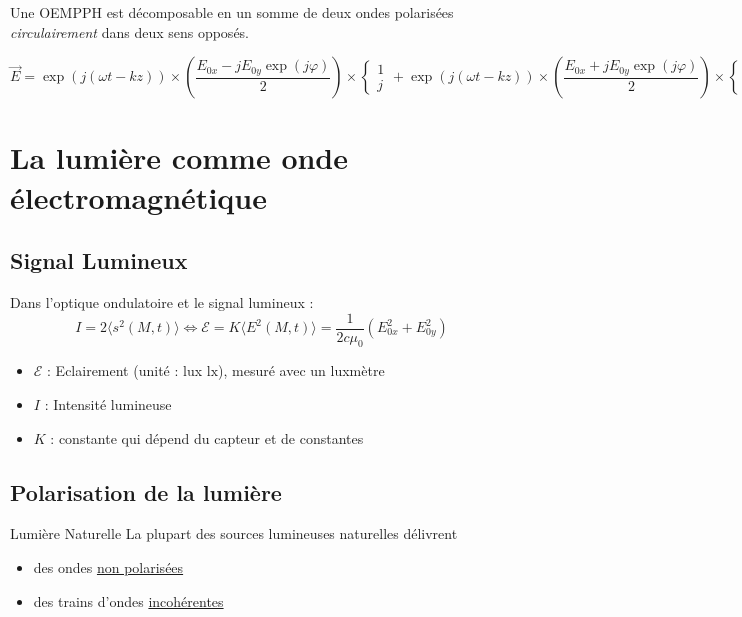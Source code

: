 Une OEMPPH est décomposable en un somme de deux ondes polarisées \textit{circulairement} dans deux sens opposés.

\[
\overrightarrow{E}  = \exp (j( \omega t-kz)) \times  \left( \frac{E_{0x} - jE_{0y} \exp(j\varphi)}{2}  \right)  \times  \begin{cases}
    1 \\ j
\end{cases} + \exp (j( \omega t - kz)) \times  \left( \frac{E_{0x}+ j E_{0y} \exp (j\varphi)}{2}  \right)  \times \begin{cases}
    1 \\ -j
\end{cases}
\]




\newpage
\section{La lumière comme onde électromagnétique}

\subsection{Signal Lumineux} %
\label{sub:Signal Lumineux}


Dans l'optique ondulatoire et le signal lumineux :
\[
  \boxed{I = 2 \langle  s^{2}(M,t)  \rangle \iff \mathcal{E}  = K \langle  E^{2}(M,t)  \rangle } = \frac{1}{2c \mu_0}  (E_{0x}^{2} + E_{0y}^{2})
\]


\begin{itemize}
    \item $\mathcal{E}$ : Eclairement (unité : lux $\mathrm{lx}$), mesuré avec un luxmètre
    \item $I$ : Intensité lumineuse
    \item $K$ : constante qui dépend du capteur et de constantes
\end{itemize}

\subsection{Polarisation de la lumière} %
\label{sub:Polarisation de la lumière}

\begin{Prop}{Lumière Naturelle}{}
La plupart des sources lumineuses naturelles délivrent 
\begin{itemize}

    \item des ondes \underline{non polarisées}
    \item des trains d'ondes \underline{incohérentes}

\end{itemize}
\end{Prop}

